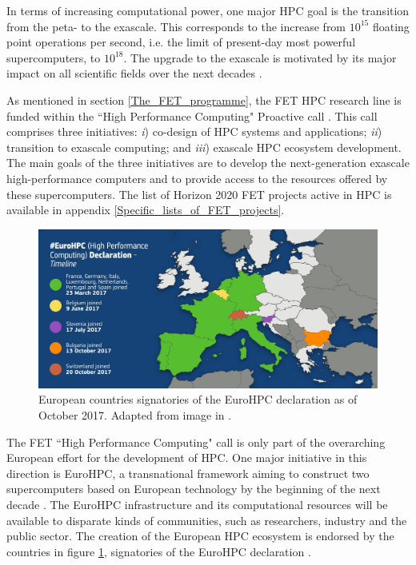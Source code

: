 In terms of increasing computational power, one major HPC goal is the transition from the peta- to the exascale. This corresponds to the increase from $10^{15}$ floating point operations per second, i.e. the limit of present-day most powerful supercomputers, to $10^{18}$. The upgrade to the exascale is motivated by its major impact on all scientific fields over the next decades \cite{Vetter}. 

As mentioned in section \ref{The_FET_programme}, the FET HPC research line is funded within the ``High Performance Computing" Proactive call \cite{HPC}. This call comprises three initiatives: \textit{i}) co-design of HPC systems and applications; \textit{ii}) transition to exascale computing; and \textit{iii}) exascale HPC ecosystem development. The main goals of the three initiatives are to develop the next-generation exascale high-performance computers and to provide access to the resources offered by these supercomputers. The list of Horizon 2020 FET projects active in HPC is available in appendix \ref{Specific_lists_of_FET_projects}.

\begin{figure}[!t] 
 \begin{center}
 \includegraphics[scale=0.23]{Images/EuroHPC.jpg}
 \caption{European countries signatories of the EuroHPC declaration as of October 2017. Adapted from image in \cite{EuroHPC_countries}.}
 \label{EuroHPC_image}
 \end{center}
\end{figure}

The FET ``High Performance Computing" call is only part of the overarching European effort for the development of HPC. One major initiative in this direction is EuroHPC, a transnational framework aiming to construct two supercomputers based on European technology by the beginning of the next decade \cite{EuroHPC}. The EuroHPC infrastructure and its computational resources will be available to disparate kinds of communities, such as researchers, industry and the public sector. The creation of the European HPC ecosystem is endorsed by the countries in figure \ref{EuroHPC_image}, signatories of the EuroHPC declaration \cite{EuroHPC_declaration}.  

